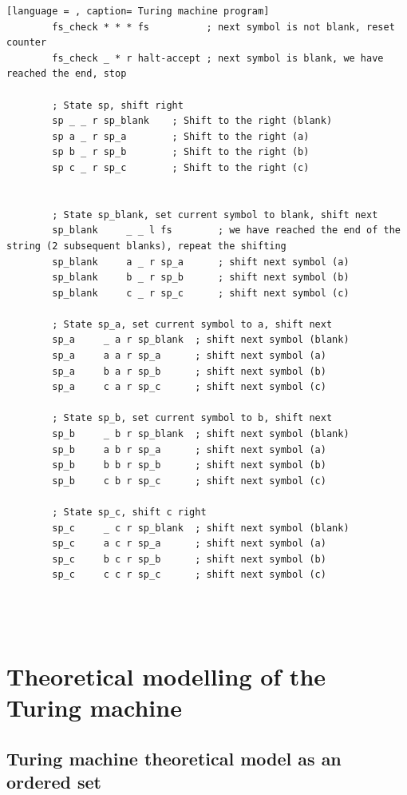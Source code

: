 \documentclass[12pt, a4paper]{report}
\begin{document}
\begin{lstlisting}[language = , caption= Turing machine program]
		fs_check * * * fs          ; next symbol is not blank, reset counter
		fs_check _ * r halt-accept ; next symbol is blank, we have reached the end, stop

		; State sp, shift right
		sp _ _ r sp_blank    ; Shift to the right (blank)
		sp a _ r sp_a        ; Shift to the right (a)
		sp b _ r sp_b        ; Shift to the right (b)
		sp c _ r sp_c        ; Shift to the right (c)


		; State sp_blank, set current symbol to blank, shift next
		sp_blank     _ _ l fs        ; we have reached the end of the string (2 subsequent blanks), repeat the shifting
		sp_blank     a _ r sp_a      ; shift next symbol (a)
		sp_blank     b _ r sp_b      ; shift next symbol (b)
		sp_blank     c _ r sp_c      ; shift next symbol (c)

		; State sp_a, set current symbol to a, shift next
		sp_a     _ a r sp_blank  ; shift next symbol (blank)
		sp_a     a a r sp_a      ; shift next symbol (a)
		sp_a     b a r sp_b      ; shift next symbol (b)
		sp_a     c a r sp_c      ; shift next symbol (c)

		; State sp_b, set current symbol to b, shift next
		sp_b     _ b r sp_blank  ; shift next symbol (blank)
		sp_b     a b r sp_a      ; shift next symbol (a)
		sp_b     b b r sp_b      ; shift next symbol (b)
		sp_b     c b r sp_c      ; shift next symbol (c)

		; State sp_c, shift c right
		sp_c     _ c r sp_blank  ; shift next symbol (blank)
		sp_c     a c r sp_a      ; shift next symbol (a)
		sp_c     b c r sp_b      ; shift next symbol (b)
		sp_c     c c r sp_c      ; shift next symbol (c)




\end{lstlisting} \label{programListing}


\chapter{Theoretical modelling of the Turing machine}


\section[]{Turing machine theoretical model as an ordered set}
\end{document}
